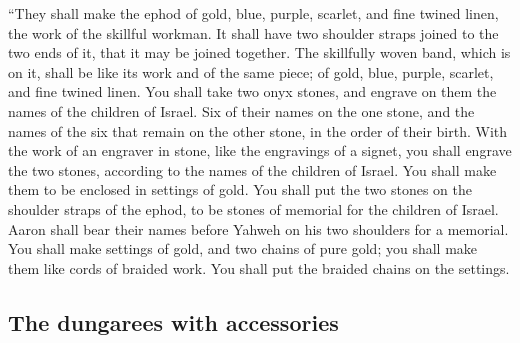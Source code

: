 \begin{paracol}{2}
\begin{otherlanguage}{english}
 ``They shall make the ephod of gold, blue, purple,
scarlet, and fine twined linen, the work of the skillful workman.
 It shall have two shoulder straps joined to the two ends
of it, that it may be joined together.  The skillfully
woven band, which is on it, shall be like its work and of the same
piece; of gold, blue, purple, scarlet, and fine twined linen.
 You shall take two onyx stones, and engrave on them the
names of the children of Israel.  Six of their names on
the one stone, and the names of the six that remain on the other stone,
in the order of their birth.  With the work of an
engraver in stone, like the engravings of a signet, you shall engrave
the two stones, according to the names of the children of Israel. You
shall make them to be enclosed in settings of gold.  You
shall put the two stones on the shoulder straps of the ephod, to be
stones of memorial for the children of Israel. Aaron shall bear their
names before Yahweh on his two shoulders for a memorial. 
You shall make settings of gold,  and two chains of pure
gold; you shall make them like cords of braided work. You shall put the
braided chains on the settings.

\hypertarget{the-dungarees-with-accessories}{%
\subsection{The dungarees with
accessories}\label{the-dungarees-with-accessories}}


\end{otherlanguage}
\end{paracol}
